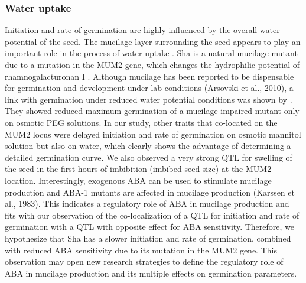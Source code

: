 \documentclass[8pt, twoside, a5paper]{report}
\begin{document}
\subsubsection{Water uptake}
Initiation and rate of germination are highly influenced by the overall water potential of the seed. The mucilage layer surrounding the seed appears to play an
important role in the process of water uptake \cite{Penfield:2001}. Sha is a natural mucilage mutant due to a mutation in the MUM2 gene, which changes the hydrophilic
potential of rhamnogalacturonan I \cite{Macquet:2007}. Although mucilage has been reported to be dispensable for germination and development under lab conditions
(Arsovski et al., 2010), a link with germination under reduced water potential conditions was shown by \cite{Penfield:2001}. They showed reduced maximum germination of a
mucilage-impaired mutant only on osmotic PEG solutions. In our study, other traits that co-located on the MUM2 locus were delayed initiation and rate of germination on osmotic
mannitol solution but also on water, which clearly shows the advantage of determining a detailed germination curve. We also observed a very strong QTL for swelling of the seed
in the first hours of imbibition (imbibed seed size) at the MUM2 location. Interestingly, exogenous ABA can be used to stimulate mucilage production and ABA-1 mutants are
affected in mucilage production (Karssen et al., 1983). This indicates a regulatory role of ABA in mucilage production and fits with our observation of the co-localization of a QTL
for initiation and rate of germination with a QTL with opposite effect for ABA sensitivity. Therefore, we hypothesize that Sha has a slower initiation and rate of germination,
combined with reduced ABA sensitivity due to its mutation in the MUM2 gene. This observation may open new research strategies to define the regulatory role of ABA in
mucilage production and its multiple effects on germination parameters.
\end{document}
